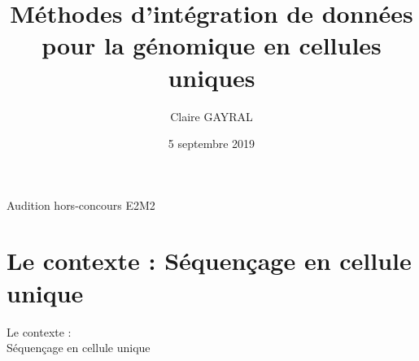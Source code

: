 \documentclass[10pt]{beamer}
\title{Méthodes d'intégration de données pour la génomique en cellules uniques}
\author{Claire \textsc{GAYRAL}}%
\date{5 septembre 2019}
\begin{document}
\begin{frame}{}
    \frametitle{}
    {\huge Audition hors-concours E2M2}
    
    \titlepage
    
\end{frame}

\section{Le contexte : Séquençage en cellule unique}
\begin{frame}{}
    \begin{center}
        {\Huge Le contexte : }\\
        \vfill
        {\LARGE Séquençage en cellule unique}
    \end{center}
\end{frame}
\end{document}
